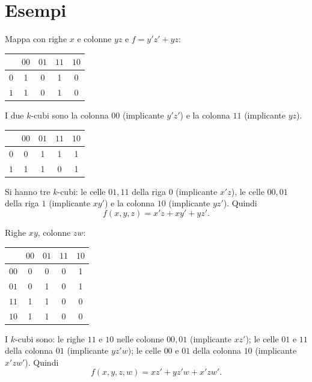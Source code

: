 \documentclass[11pt,a4paper]{article}
\begin{document}
\section{Esempi}

\begin{esempio}
Mappa con righe $x$ e colonne $yz$ e $f = y'z' + yz$:
\begin{center}
\begin{tabular}{c|cccc}
 & $00$ & $01$ & $11$ & $10$ \\
\midrule
$0$ & 1 & 0 & 1 & 0 \\
$1$ & 1 & 0 & 1 & 0 \\
\end{tabular}
\end{center}
I due $k$-cubi sono la colonna $00$ (implicante $y'z'$) e la colonna $11$ (implicante $yz$).
\end{esempio}

\begin{esempio}
\begin{center}
\begin{tabular}{c|cccc}
 & $00$ & $01$ & $11$ & $10$ \\
\midrule
$0$ & 0 & 1 & 1 & 1 \\
$1$ & 1 & 1 & 0 & 1 \\
\end{tabular}
\end{center}
Si hanno tre $k$-cubi: le celle $01,11$ della riga $0$ (implicante $x'z$), le celle $00,01$ della riga $1$ (implicante $xy'$) e la colonna $10$ (implicante $yz'$). Quindi
\[
f(x,y,z) = x'z + xy' + yz'.
\]
\end{esempio}

\begin{esempio}
Righe $xy$, colonne $zw$:
\begin{center}
\begin{tabular}{c|cccc}
 & $00$ & $01$ & $11$ & $10$ \\
\midrule
$00$ & 0 & 0 & 0 & 1 \\
$01$ & 0 & 1 & 0 & 1 \\
$11$ & 1 & 1 & 0 & 0 \\
$10$ & 1 & 1 & 0 & 0 \\
\end{tabular}
\end{center}
I $k$-cubi sono: le righe $11$ e $10$ nelle colonne $00,01$ (implicante $xz'$); le celle $01$ e $11$ della colonna $01$ (implicante $yz'w$); le celle $00$ e $01$ della colonna $10$ (implicante $x'zw'$). Quindi
\[
f(x,y,z,w) = xz' + yz'w + x'zw'.
\]
\end{esempio}
\end{document}
